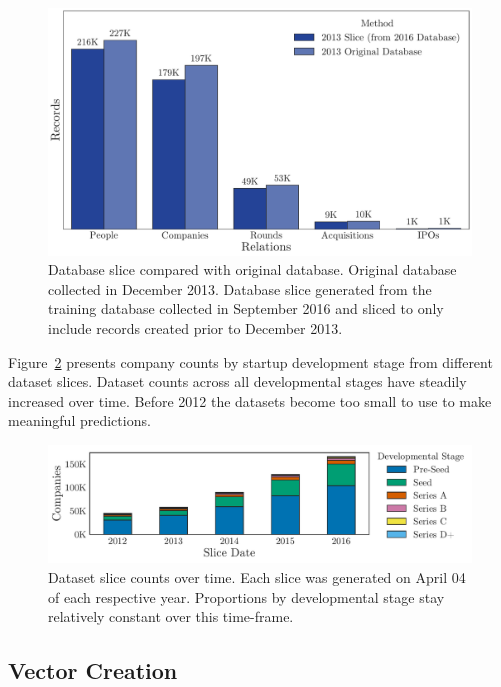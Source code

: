 \documentclass[../thesis/thesis.tex]{subfiles}
\begin{document}
\begin{figure}[!htb]
    \centering
    \includegraphics[width=\textwidth]{../figures/design/counts_slice_method}
    \caption[Database slice compared with original database]{Database slice compared with original database. Original database collected in December 2013. Database slice generated from the training database collected in September 2016 and sliced to only include records created prior to December 2013.}
    \label{fig:design:counts_slice_method}
\end{figure}

Figure~\ref{fig:design:slice_counts_over_time} presents company counts by startup development stage from different dataset slices. Dataset counts across all developmental stages have steadily increased over time. Before 2012 the datasets become too small to use to make meaningful predictions.

\begin{figure}[!htb]
    \centering
    \includegraphics[width=\textwidth]{../figures/design/counts_stage_slice}
    \caption[Dataset counts over time]{Dataset slice counts over time. Each slice was generated on April 04 of each respective year. Proportions by developmental stage stay relatively constant over this time-frame.}
    \label{fig:design:slice_counts_over_time}
\end{figure}

\subsection{Vector Creation}
\end{document}
